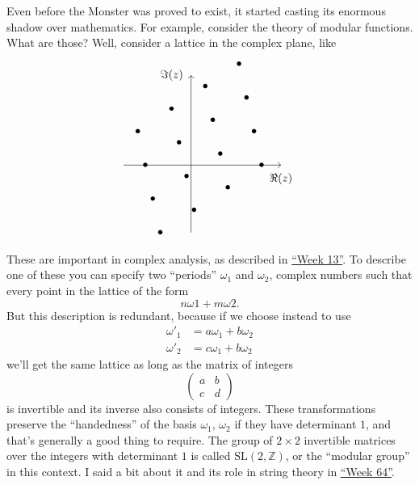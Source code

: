 \documentclass{article}
\begin{document}
Even before the Monster was proved to exist, it started casting its
enormous shadow over mathematics. For example, consider the theory of
modular functions. What are those? Well, consider a lattice in the
complex plane, like \[
  \begin{tikzpicture}[scale=0.7]
    \draw[->] (-3,0) to (4,0) node[label=below:{$\Re(z)$}]{};
    \draw[->] (0,-3) to (0,4) node[label=left:{$\Im(z)$}]{};
    \foreach \m in {-1,0,1,2}
    {
      \foreach \n in {-1,0,1,2}
      {
        \node at ({\m*1.5-\n/3-0.2},{1.5*\n+\m-0.5}) {$\bullet$};
      }
    }
  \end{tikzpicture}
\] These are important in complex analysis, as described in
\protect\hyperlink{week13}{``Week 13''}. To describe one of these you
can specify two ``periods'' \(\omega_1\) and \(\omega_2\), complex
numbers such that every point in the lattice of the form
\[n \omega1 + m \omega2.\] But this description is redundant, because if
we choose instead to use \[
  \begin{aligned}
    \omega'_1 &= a\omega_1+b\omega_2
  \\\omega'_2 &= c\omega_1+b\omega_2
  \end{aligned}
\] we'll get the same lattice as long as the matrix of integers \[
  \left(
    \begin{array}{cc}
      a&b\\c&d
    \end{array}
  \right)
\] is invertible and its inverse also consists of integers. These
transformations preserve the ``handedness'' of the basis \(\omega_1\),
\(\omega_2\) if they have determinant \(1\), and that's generally a good
thing to require. The group of \(2\times2\) invertible matrices over the
integers with determinant \(1\) is called \(\mathrm{SL}(2,\mathbb{Z})\),
or the ``modular group'' in this context. I said a bit about it and its
role in string theory in \protect\hyperlink{week64}{``Week 64''}.
\end{document}
